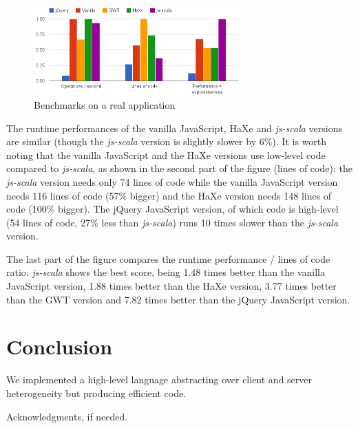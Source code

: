 \documentclass[preprint]{sigplanconf}
\begin{document}
\begin{figure}
\centering
\includegraphics[width=8cm]{chooze.png}
\caption{Benchmarks on a real application}
\label{benchmark}
\end{figure}

The runtime performances of the vanilla JavaScript, HaXe and \emph{js-scala} versions are similar (though the
\emph{js-scala} version is slightly slower by 6\%). It is worth noting that the vanilla JavaScript and the HaXe
versions use low-level code compared to \emph{js-scala}, as shown in the second part of the figure (lines of code):
the \emph{js-scala} version needs only 74 lines of code while the vanilla JavaScript version needs 116 lines of code
(57\% bigger) and the HaXe version needs 148 lines of code (100\% bigger). The jQuery JavaScript version, of which
code is high-level (54 lines of code, 27\% less than \emph{js-scala}) runs 10 times slower than the \emph{js-scala}
version.

The last part of the figure compares the runtime performance / lines of code ratio. \emph{js-scala} shows the best
score, being 1.48 times better than the vanilla JavaScript version, 1.88 times better than the HaXe version,
3.77 times better than the GWT version and 7.82 times better than the jQuery JavaScript version.

\section{Conclusion}
\label{discussion}

We implemented a high-level language abstracting over client and server heterogeneity but producing efficient code.

%
%
\acks

Acknowledgments, if needed.



%
%
%
\end{document}
